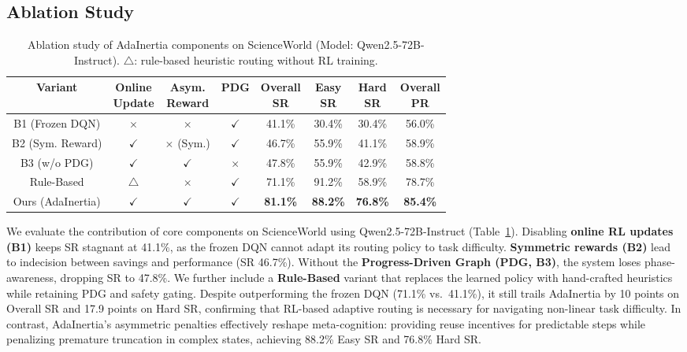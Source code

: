 \documentclass[runningheads]{llncs}
\begin{document}
\subsection{Ablation Study}
\begin{table}[htb]
    \centering
    \footnotesize
    \renewcommand{\arraystretch}{0.95}
    \vspace{-2mm}
    \caption{Ablation study of AdaInertia components on ScienceWorld (Model: Qwen2.5-72B-Instruct). $\triangle$: rule-based heuristic routing without RL training.}
    \label{tab:table2}
    \vspace{-1mm}
    \setlength{\tabcolsep}{3pt}
    \begin{tabular}{cccccccc}
    \toprule
    \textbf{Variant} & \makecell{Online\\Update} & \makecell{Asym.\\Reward} & \textbf{PDG} & \makecell{Overall\\SR} & \makecell{Easy\\SR} & \makecell{Hard\\SR} & \makecell{Overall\\PR} \\
    \midrule
    B1 (Frozen DQN)  & $\times$ & $\times$ & $\checkmark$ & 41.1\% & 30.4\% & 30.4\% & 56.0\%\\
    B2 (Sym. Reward) & $\checkmark$ & \makecell{$\times$\\(Sym.)} & $\checkmark$ & 46.7\% & 55.9\% & 41.1\% & 58.9\%\\
    B3 (w/o PDG)     & $\checkmark$ & $\checkmark$ & $\times$ & 47.8\% & 55.9\% & 42.9\% & 58.8\%\\
    Rule-Based       & $\triangle$ & $\times$ & $\checkmark$ & 71.1\% & 91.2\% & 58.9\% & 78.7\%\\
    Ours (AdaInertia)& $\checkmark$ & $\checkmark$ & $\checkmark$ & \textbf{81.1\%} & \textbf{88.2\%} & \textbf{76.8\%} & \textbf{85.4\%}\\
    \bottomrule
    \end{tabular}
    \vspace{-4mm}
\end{table}
We evaluate the contribution of core components on ScienceWorld using Qwen2.5-72B-Instruct (Table~\ref{tab:table2}). Disabling \textbf{online RL updates (B1)} keeps SR stagnant at 41.1\%, as the frozen DQN cannot adapt its routing policy to task difficulty. \textbf{Symmetric rewards (B2)} lead to indecision between savings and performance (SR 46.7\%). Without the \textbf{Progress-Driven Graph (PDG, B3)}, the system loses phase-awareness, dropping SR to 47.8\%. We further include a \textbf{Rule-Based} variant that replaces the learned policy with hand-crafted heuristics while retaining PDG and safety gating. Despite outperforming the frozen DQN (71.1\% vs.\ 41.1\%), it still trails AdaInertia by 10 points on Overall SR and 17.9 points on Hard SR, confirming that RL-based adaptive routing is necessary for navigating non-linear task difficulty. In contrast, AdaInertia's asymmetric penalties effectively reshape meta-cognition: providing reuse incentives for predictable steps while penalizing premature truncation in complex states, achieving 88.2\% Easy SR and 76.8\% Hard SR.
\end{document}
